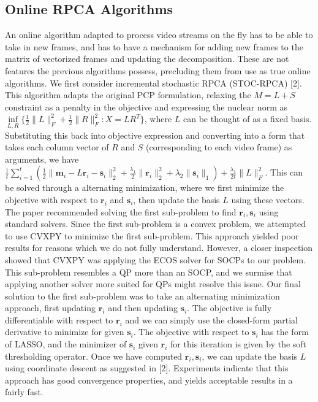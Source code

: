 \documentclass[oneside]{article}
\begin{document}
\subsection{Online RPCA Algorithms}
An online algorithm adapted to process video streams on the fly has to be able to take in new frames, and has to have a mechanism for adding new frames to the matrix of vectorized frames and updating the decomposition. These are not features the previous algorithms possess, precluding them from use as true online algorithms.
We first consider incremental stochastic RPCA (STOC-RPCA) [2]. This algorithm adapts the original PCP formulation, relaxing the $M=L+S$ constraint as a penalty in the objective and 
expressing the nuclear norm as $\inf\limits_{L,R}\{\frac{1}{2}\lVert L\rVert_{F}^{2} +\frac{1}{2}\lVert R\rVert_{F}^{2}: X = LR^{T}\}$, where $L$ can be thought of as a fixed basis. Substituting this back into objective expression and converting into a form that takes each column vector of $R$ and $S$ (corresponding to each video frame) as arguments, we have $\frac{1}{t}\sum_{i=1}^{t}(\frac{1}{2}\lVert \textbf{m}_{i} - L\textbf{r}_{i} - \textbf{s}_{i}\rVert_{2}^{2} +\frac{\lambda_{1}}{2}\lVert \textbf{r}_{i}\rVert^{2}_{2} +\lambda_{2}\lVert \textbf{s}_{i}\rVert_{1}) + \frac{\lambda_{1}}{2t}\lVert L\rVert_{F}^{2}$. This can be solved through a alternating minimization, where we first minimize the objective with respect to $\textbf{r}_{i}$ and $\textbf{s}_{i}$, then update the basis $L$ using these vectors.\newline\newline
The paper recommended solving the first sub-problem to find $\textbf{r}_{i}, \textbf{s}_{i}$ using standard solvers. Since the first sub-problem is a convex problem, we attempted to use CVXPY to minimize the first sub-problem. This approach yielded poor results for reasons which we do not fully understand. However, a closer inspection showed that CVXPY was applying the ECOS solver for SOCPs to our problem. This sub-problem resembles a QP more than an SOCP, and we surmise that applying another solver more suited for QPs might resolve this issue. Our final solution to the first sub-problem was to take an alternating minimization approach, first updating $\textbf{r}_{i}$ and then updating $\textbf{s}_{i}$. The objective is fully differentiable with respect to $\textbf{r}_{i}$ and we can simply use the closed-form partial derivative to minimize for given $\textbf{s}_{i}$. The objective with respect to $\textbf{s}_{i}$ has the form of LASSO, and the minimizer of $\textbf{s}_{i}$ given $\textbf{r}_{i}$ for this iteration is given by the soft thresholding operator. Once we have computed $\textbf{r}_{i}, \textbf{s}_{i}$, we can update the basis $L$ using coordinate descent as suggested in [2]. Experiments indicate that this approach has good convergence properties, and yields acceptable results in a fairly fast.\newline\newline
\end{document}
